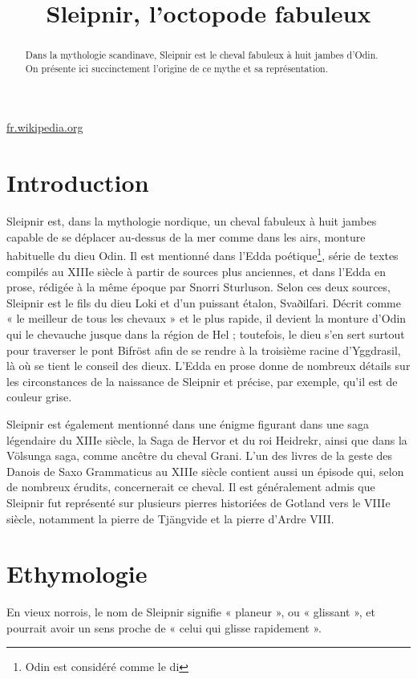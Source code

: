 \documentclass[a4paper,12pt]{article}
\begin{document}
\title{Sleipnir, l’octopode fabuleux}
\date{}


\maketitle
\tableofcontents
\begin{center}
{\Large\href{fr.wikipedia.org}{fr.wikipedia.org}}
\end{center}
\smallskip
\begin{abstract}
Dans la mythologie scandinave, Sleipnir est le cheval fabuleux à huit
jambes d’Odin. On présente ici succinctement l’origine de ce mythe et
sa représentation.
\end{abstract}

\section{Introduction}

Sleipnir est, dans la mythologie nordique, un cheval fabuleux à huit jambes capable de se déplacer au-dessus de la mer comme dans les airs, monture habituelle du dieu Odin. Il est mentionné dans l’Edda poétique\footnote{Odin est considéré comme le di}, série de textes compilés au XIIIe siècle à partir de sources plus anciennes, et dans l’Edda en prose, rédigée à la même époque par Snorri Sturluson. Selon ces deux sources, Sleipnir est le fils du dieu Loki et d'un puissant étalon, Svaðilfari. Décrit comme « le meilleur de tous les chevaux » et le plus rapide, il devient la monture d'Odin qui le chevauche jusque dans la région de Hel ; toutefois, le dieu s'en sert surtout pour traverser le pont Bifröst afin de se rendre à la troisième racine d'Yggdrasil, là où se tient le conseil des dieux. L'Edda en prose donne de nombreux détails sur les circonstances de la naissance de Sleipnir et précise, par exemple, qu'il est de couleur grise.

Sleipnir est également mentionné dans une énigme figurant dans une saga légendaire du XIIIe siècle, la Saga de Hervor et du roi Heidrekr, ainsi que dans la Völsunga saga, comme ancêtre du cheval Grani. L'un des livres de la geste des Danois de Saxo Grammaticus au XIIIe siècle contient aussi un épisode qui, selon de nombreux érudits, concernerait ce cheval. Il est généralement admis que Sleipnir fut représenté sur plusieurs pierres historiées de Gotland vers le VIIIe siècle, notamment la pierre de Tjängvide et la pierre d'Ardre VIII.
\section{Ethymologie}
En vieux norrois, le nom de Sleipnir signifie « planeur », ou « glissant »,
et pourrait avoir un sens proche de « celui qui glisse rapidement ».
\end{document}
